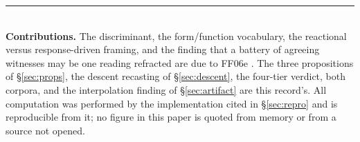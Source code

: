 \documentclass[11pt]{article}
\theoremstyle{remark}
\begin{document}
\vspace{1em}\noindent\rule{\linewidth}{0.4pt}\\[2pt]
\small\textbf{Contributions.} The discriminant, the form/function vocabulary, the
reactional versus response-driven framing, and the finding that a battery of agreeing
witnesses may be one reading refracted are due to FF06e \cite{ff06e}. The three
propositions of \S\ref{sec:props}, the descent recasting of \S\ref{sec:descent}, the
four-tier verdict, both corpora, and the interpolation finding of \S\ref{sec:artifact}
are this record's. All computation was performed by the implementation cited in
\S\ref{sec:repro} and is reproducible from it; no figure in this paper is quoted from
memory or from a source not opened.
\end{document}
